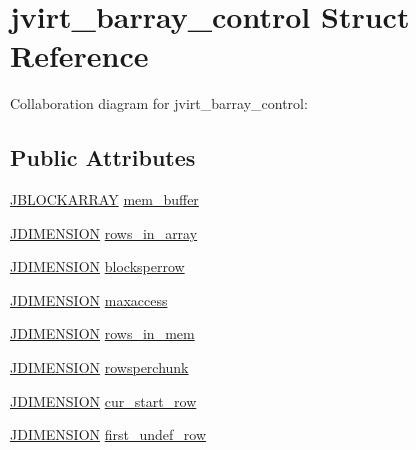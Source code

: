 \hypertarget{structjvirt__barray__control}{}\section{jvirt\+\_\+barray\+\_\+control Struct Reference}
\label{structjvirt__barray__control}


Collaboration diagram for jvirt\+\_\+barray\+\_\+control\+:
\subsection*{Public Attributes}
\begin{DoxyCompactItemize}
\item 
\mbox{\hyperlink{jpeglib_8h_ab03cfeb937b60b9b73ca6e3cf935af49}{J\+B\+L\+O\+C\+K\+A\+R\+R\+AY}} \mbox{\hyperlink{structjvirt__barray__control_a8afb55dcf60348a5ae746e19315f745e}{mem\+\_\+buffer}}
\item 
\mbox{\hyperlink{jmorecfg_8h_a04ed4674f6f1d0d50ec241531e38274f}{J\+D\+I\+M\+E\+N\+S\+I\+ON}} \mbox{\hyperlink{structjvirt__barray__control_a57c1bf0ff557df3e1e0926e367a6b635}{rows\+\_\+in\+\_\+array}}
\item 
\mbox{\hyperlink{jmorecfg_8h_a04ed4674f6f1d0d50ec241531e38274f}{J\+D\+I\+M\+E\+N\+S\+I\+ON}} \mbox{\hyperlink{structjvirt__barray__control_a6c148bce80b027c114ec7d37221cd175}{blocksperrow}}
\item 
\mbox{\hyperlink{jmorecfg_8h_a04ed4674f6f1d0d50ec241531e38274f}{J\+D\+I\+M\+E\+N\+S\+I\+ON}} \mbox{\hyperlink{structjvirt__barray__control_a47ffc73c735353eaac752145847cfc92}{maxaccess}}
\item 
\mbox{\hyperlink{jmorecfg_8h_a04ed4674f6f1d0d50ec241531e38274f}{J\+D\+I\+M\+E\+N\+S\+I\+ON}} \mbox{\hyperlink{structjvirt__barray__control_a23aa025027bba6a29287b1460d72bf71}{rows\+\_\+in\+\_\+mem}}
\item 
\mbox{\hyperlink{jmorecfg_8h_a04ed4674f6f1d0d50ec241531e38274f}{J\+D\+I\+M\+E\+N\+S\+I\+ON}} \mbox{\hyperlink{structjvirt__barray__control_ad31f701b81d11db2bd5fa33579d9674e}{rowsperchunk}}
\item 
\mbox{\hyperlink{jmorecfg_8h_a04ed4674f6f1d0d50ec241531e38274f}{J\+D\+I\+M\+E\+N\+S\+I\+ON}} \mbox{\hyperlink{structjvirt__barray__control_ae1e7828cda2f39e8ffdd7e0cc4336f76}{cur\+\_\+start\+\_\+row}}
\item 
\mbox{\hyperlink{jmorecfg_8h_a04ed4674f6f1d0d50ec241531e38274f}{J\+D\+I\+M\+E\+N\+S\+I\+ON}} \mbox{\hyperlink{structjvirt__barray__control_aa4bba1a9fc9dfdbb43d926f27016bb08}{first\+\_\+undef\+\_\+row}}

\end{DoxyCompactItemize}
